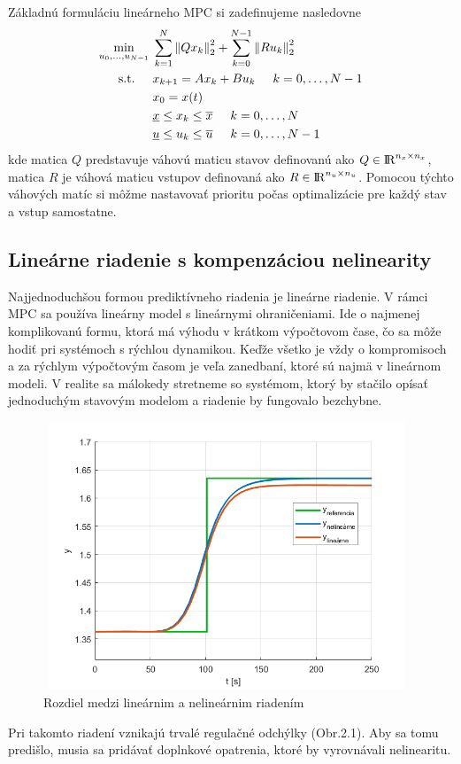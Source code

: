 Základnú formuláciu lineárneho MPC si zadefinujeme nasledovne
\label{math:LinearneMPC}
\begin{subequations}
	\begin{align}
		\displaystyle \min_{u_0,...,u_{N-1}} \hspace{0.1cm} & 
		\sum_{k=1}^{N}\left\lVert Qx_k\right\rVert^{2}_{2}+\sum_{k=0}^{N-1}\left\lVert Ru_k\right\rVert^{2}_{2}\\
		\textrm{s.t.} \hspace{0.5cm} & x_{k+1} = Ax_{k}+Bu_{k}\hspace{0.5cm} k=0,\dots,N-1\\
		& x_{0} = x(t)\\
		& \underline{x} \leq x_{k} \leq \overline{x}\hspace{0.5cm} k=0,\dots,N\\
		& \underline{u} \leq u_{k} \leq \overline{u}\hspace{0.5cm} k=0,\dots,N-1
	\end{align}
\end{subequations}
kde matica $Q$ predstavuje váhovú maticu stavov definovanú ako $Q \in {\rm I\!R}^{n_{x}\times n_{x}}$, matica $R$ je váhová maticu vstupov definovaná ako $R \in {\rm I\!R}^{n_{u}\times n_{u}}$. Pomocou týchto váhových matíc si môžme nastavovať prioritu počas optimalizácie pre každý stav a vstup samostatne. 

\subsection{Lineárne riadenie s kompenzáciou nelinearity}
\label{subse:LinearneMPCKomp}
Najjednoduchšou formou prediktívneho riadenia je lineárne riadenie. V rámci MPC sa používa lineárny model s lineárnymi ohraničeniami. Ide o najmenej komplikovanú formu, ktorá má výhodu v krátkom výpočtovom čase, čo sa môže hodiť pri systémoch s rýchlou dynamikou. Keďže všetko je vždy o kompromisoch a za rýchlym výpočtovým časom je veľa zanedbaní, ktoré sú najmä v lineárnom modeli. V realite sa málokedy stretneme so systémom, ktorý by stačilo opísať jednoduchým stavovým modelom a riadenie by fungovalo bezchybne. 
\begin{figure}[H]
	\centering
	\includegraphics[width=11cm,height=8cm]{images/linear_vs_nonlinear}
	\caption{Rozdiel medzi lineárnim a nelineárnim riadením}
\end{figure}
Pri takomto riadení vznikajú trvalé regulačné odchýlky (Obr.2.1). Aby sa tomu predišlo, musia sa pridávať doplnkové opatrenia, ktoré by vyrovnávali nelinearitu. 

